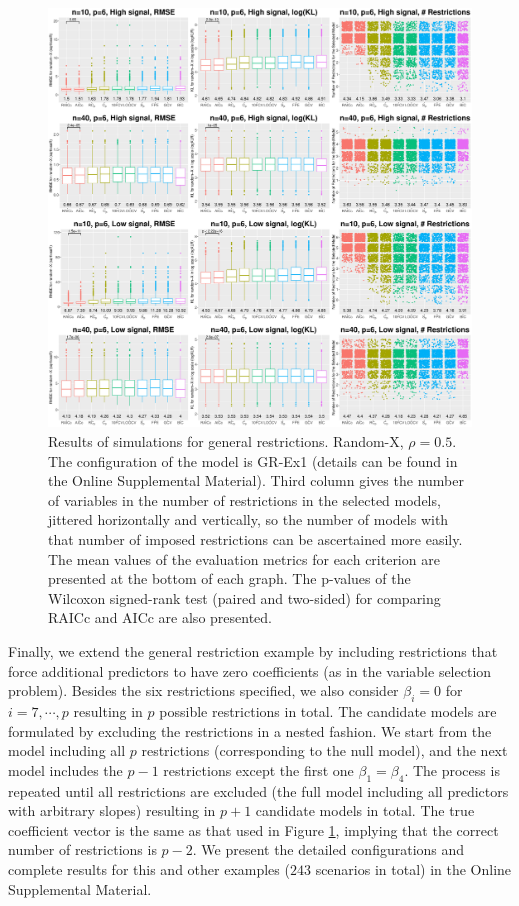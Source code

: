 \begin{figure}[!ht]
  \centering
  \includegraphics[width=\textwidth]{figures/main/randomx_GR-Ex1.eps}
  \caption{Results of simulations for general restrictions. Random-X, $\rho=0.5$. The configuration of the model is GR-Ex1 (details can be found in the Online Supplemental Material). Third column gives the number of variables in the number of restrictions in the selected models, jittered horizontally and vertically, so the number of models with that number of imposed restrictions can be ascertained more easily. The mean values of the evaluation metrics for each criterion are presented at the bottom of each graph. The p-values of the Wilcoxon signed-rank test (paired and two-sided) for comparing RAICc and AICc are also presented.}
  \label{fig:generalrestriction_randomx}
\end{figure}

Finally, we extend the general restriction example by including restrictions that force additional predictors to have zero coefficients (as in the variable selection problem). Besides the six restrictions specified, we also consider $\beta_i=0$ for $i=7,\cdots,p$ resulting in $p$ possible restrictions in total. The candidate models are formulated by excluding the restrictions in a nested fashion. We start from the model including all $p$ restrictions (corresponding to the null model), and the next model includes the $p-1$ restrictions except the first one $\beta_1=\beta_4$. The process is repeated until all restrictions are excluded (the full model including all predictors with arbitrary slopes) resulting in $p+1$ candidate models in total. The true coefficient vector is the same as that used in Figure \ref{fig:generalrestriction_randomx}, implying that the correct number of restrictions is $p-2$. We present the detailed configurations and complete results for this and other examples ($243$ scenarios in total) in the Online Supplemental Material. 

